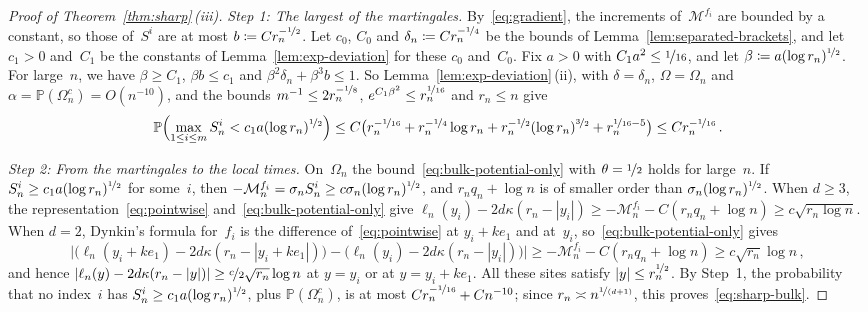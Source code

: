 \documentclass[11pt]{amsart}
\theoremstyle{plain}
\theoremstyle{definition}
\renewcommand{\P}{\mathbb P}
\newcommand{\drift}{\kappa}
\newcommand{\nf}{\nicefrac}
\numberwithin{equation}{section}
\begin{document}
\begin{proof}[Proof of Theorem~\ref{thm:sharp}\,\textup{(iii)}]
\emph{Step 1: The largest of the martingales.} By~\eqref{eq:gradient}, the increments of~$\mathcal M^{f_i}$ are bounded by a constant, so those of~$S^i$ are at most $b\coloneqq Cr_n^{-\nf12}$. Let $c_0$, $C_0$ and $\delta_n\coloneqq Cr_n^{-\nf14}$ be the bounds of Lemma~\ref{lem:separated-brackets}, and let $c_1>0$ and~$C_1$ be the constants of Lemma~\ref{lem:exp-deviation} for these $c_0$ and~$C_0$. Fix $a>0$ with $C_1a^2\leq\nf1{16}$, and let $\beta\coloneqq a(\log r_n)^{\nf12}$. For large~$n$, we have $\beta\geq C_1$, $\beta b\leq c_1$ and $\beta^2\delta_n+\beta^3b\leq1$. So Lemma~\ref{lem:exp-deviation}\,(ii), with $\delta=\delta_n$, $\Omega=\Omega_n$ and $\alpha=\P(\Omega_n^c)=O(n^{-10})$, and the bounds $m^{-1}\leq2r_n^{-\nf18}$, $e^{C_1\beta^2}\leq r_n^{\nf1{16}}$ and $r_n\leq n$ give
\begin{equation*}
\P\Bigl(\max_{1\leq i\leq m}S^i_n<c_1a(\log r_n)^{\nf12}\Bigr)
\leq C\bigl(r_n^{-\nf1{16}}+r_n^{-\nf14}\log r_n+r_n^{-\nf12}(\log r_n)^{\nf32}+r_n^{\nf1{16}-5}\bigr)
\leq Cr_n^{-\nf1{16}}\, .
\end{equation*}

\emph{Step 2: From the martingales to the local times.} On~$\Omega_n$ the bound~\eqref{eq:bulk-potential-only} with $\theta=\nf12$ holds for large~$n$. If $S^i_n\geq c_1a(\log r_n)^{\nf12}$ for some~$i$, then $-\mathcal M^{f_i}_n=\sigma_nS^i_n\geq c\sigma_n(\log r_n)^{\nf12}$, and $r_nq_n+\log n$ is of smaller order than $\sigma_n(\log r_n)^{\nf12}$. When $d\geq3$, the representation~\eqref{eq:pointwise} and~\eqref{eq:bulk-potential-only} give $\ell_n(y_i)-2d\drift(r_n-|y_i|)\geq-\mathcal M^{f_i}_n-C(r_nq_n+\log n)\geq c\sqrt{r_n\log n}$. When $d=2$, Dynkin's formula for~$f_i$ is the difference of~\eqref{eq:pointwise} at $y_i+ke_1$ and at~$y_i$, so~\eqref{eq:bulk-potential-only} gives
\begin{equation*}
\bigl|\bigl(\ell_n(y_i+ke_1)-2d\drift(r_n-|y_i+ke_1|)\bigr)-\bigl(\ell_n(y_i)-2d\drift(r_n-|y_i|)\bigr)\bigr|
\geq-\mathcal M^{f_i}_n-C(r_nq_n+\log n)\geq c\sqrt{r_n}\log n\, ,
\end{equation*}
and hence $|\ell_n(y)-2d\drift(r_n-|y|)|\geq\nf c2\sqrt{r_n}\log n$ at $y=y_i$ or at $y=y_i+ke_1$. All these sites satisfy $|y|\leq r_n^{\nf12}$. By Step~1, the probability that no index~$i$ has $S^i_n\geq c_1a(\log r_n)^{\nf12}$, plus $\P(\Omega_n^c)$, is at most $Cr_n^{-\nf1{16}}+Cn^{-10}$; since $r_n\asymp n^{\nf{1}{(d+1)}}$, this proves~\eqref{eq:sharp-bulk}.
\end{proof}
\end{document}
